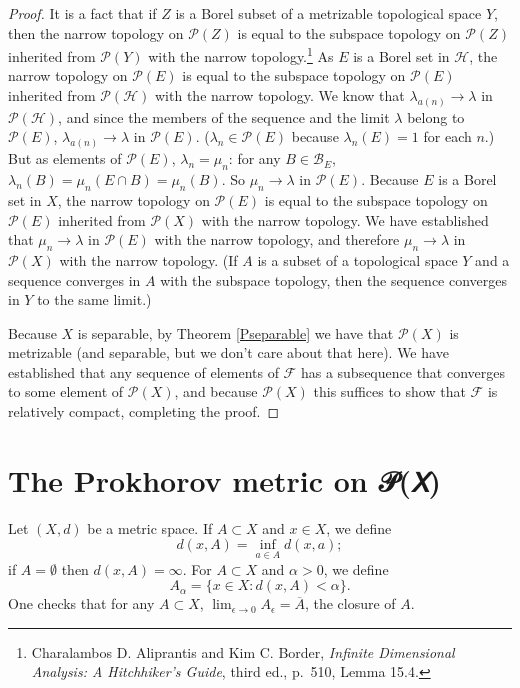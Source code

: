 \documentclass{article}
\theoremstyle{definition}
\theoremstyle{definition}
\begin{document}
\begin{proof}
It is a fact that if $Z$ is a Borel subset of a metrizable topological space $Y$, then the narrow topology
on $\mathscr{P}(Z)$ is equal to the subspace topology on $\mathscr{P}(Z)$ inherited from $\mathscr{P}(Y)$ with the narrow
topology.\footnote{Charalambos D. 
Aliprantis and Kim C. Border, {\em Infinite Dimensional Analysis: A Hitchhiker's Guide}, third ed., p.~510, Lemma 15.4.}
As $E$ is a Borel set in $\mathscr{H}$,  the narrow topology on $\mathscr{P}(E)$ is equal to the subspace
topology on $\mathscr{P}(E)$ inherited from $\mathscr{P}(\mathscr{H})$ with the narrow topology.
We know that $\lambda_{a(n)} \to \lambda$ in $\mathscr{P}(\mathscr{H})$, and since
the members of the sequence and the limit $\lambda$ belong to $\mathscr{P}(E)$, 
$\lambda_{a(n)} \to \lambda$ in 
$\mathscr{P}(E)$. ($\lambda_n \in \mathscr{P}(E)$ because $\lambda_n(E)=1$ for each $n$.)
But as elements of $\mathscr{P}(E)$, $\lambda_n = \mu_n$: for any $B \in \mathscr{B}_E$, $\lambda_n(B) = \mu_n(E \cap B)= \mu_n(B)$. 
So $\mu_n \to \lambda$ in $\mathscr{P}(E)$. 
Because $E$ is a Borel set in $X$, the narrow topology on $\mathscr{P}(E)$ is equal to the subspace topology on
$\mathscr{P}(E)$ inherited from $\mathscr{P}(X)$ with the narrow topology. We have established
 that $\mu_n \to \lambda$ in $\mathscr{P}(E)$ with the narrow
topology, and therefore $\mu_n \to \lambda$ in $\mathscr{P}(X)$ with the narrow topology. (If $A$ is a subset of a topological space $Y$ and
a sequence converges in $A$ with the subspace topology, then the sequence converges in $Y$ to the same limit.)

Because $X$ is separable, by Theorem \ref{Pseparable} we have that $\mathscr{P}(X)$ is metrizable (and separable, but we don't care about that here).
We have established that any sequence of elements of $\mathscr{F}$ has a subsequence that converges to some element of
$\mathscr{P}(X)$, and because $\mathscr{P}(X)$ this suffices to show that $\mathscr{F}$ is relatively compact, completing the proof.
\end{proof}

\section{The Prokhorov metric on 𝒫(𝘟)}
Let $(X,d)$ be a metric space. If $A \subset X$ and $x \in X$, we define
\[
d(x,A) = \inf_{a \in A} d(x,a);
\] 
if $A = \emptyset$ then $d(x,A)=\infty$. 
For $A \subset X$ and $\alpha >0$, we define
\[
A_\alpha = \{x \in X: d(x,A)<\alpha\}.
\]
One checks that for any $A \subset X$, $\lim_{\epsilon \to 0} A_\epsilon = \overline{A}$, the closure of $A$.
\end{document}
